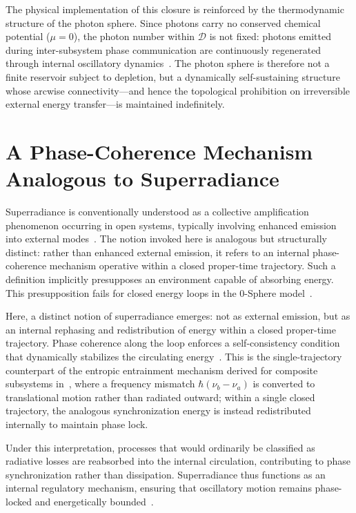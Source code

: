 \documentclass[12pt,a4paper]{article}
\begin{document}
The physical implementation of this closure is reinforced by the thermodynamic structure of the photon sphere. Since photons carry no conserved chemical potential ($\mu = 0$), the photon number within $\mathcal{D}$ is not fixed: photons emitted during inter-subsystem phase communication are continuously regenerated through internal oscillatory dynamics~\cite{hanamura18437010}. The photon sphere is therefore not a finite reservoir subject to depletion, but a dynamically self-sustaining structure whose arcwise connectivity---and hence the topological prohibition on irreversible external energy transfer---is maintained indefinitely.

\section{A Phase-Coherence Mechanism Analogous to Superradiance}
\label{sec:superradiance}

\justifying

Superradiance is conventionally understood as a collective amplification phenomenon occurring in open systems, typically involving enhanced emission into external modes~\cite{dicke1954,gross1982}. The notion invoked here is analogous but structurally distinct: rather than enhanced external emission, it refers to an internal phase-coherence mechanism operative within a closed proper-time trajectory. Such a definition implicitly presupposes an environment capable of absorbing energy. This presupposition fails for closed energy loops in the 0-Sphere model~\cite{hanamura18275142,hanamura18203433}.

Here, a distinct notion of superradiance emerges: not as external emission, but as an internal rephasing and redistribution of energy within a closed proper-time trajectory. Phase coherence along the loop enforces a self-consistency condition that dynamically stabilizes the circulating energy~\cite{hanamura18356895}. This is the single-trajectory counterpart of the entropic entrainment mechanism derived for composite subsystems in~\cite{hanamura18437010}, where a frequency mismatch $\hbar(\nu_b - \nu_a)$ is converted to translational motion rather than radiated outward; within a single closed trajectory, the analogous synchronization energy is instead redistributed internally to maintain phase lock.

Under this interpretation, processes that would ordinarily be classified as radiative losses are reabsorbed into the internal circulation, contributing to phase synchronization rather than dissipation. Superradiance thus functions as an internal regulatory mechanism, ensuring that oscillatory motion remains phase-locked and energetically bounded~\cite{hanamura18511664}.
\end{document}
